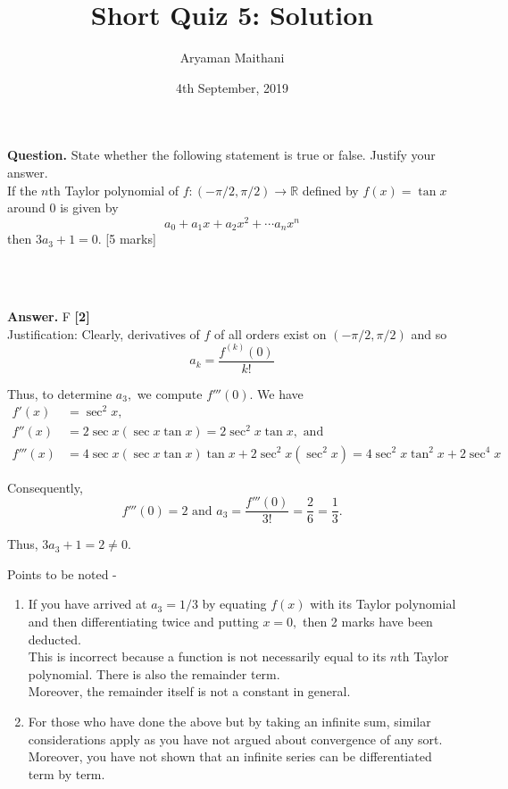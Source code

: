 \documentclass{article}
\title{Short Quiz 5: Solution}      %
\author{Aryaman Maithani}
\date{4th September, 2019}  		 %
\begin{document}
\maketitle

\hrulefill

\textbf{Question.} State whether the following statement is true or false. Justify your answer.\\ 
If the $n$th Taylor polynomial of $f:\left(-\pi/2, \pi/2\right) \to \mathbb{R}$ defined by $f(x) = \tan x$ around $0$ is given by
\[a_0 + a_1x + a_2x^2 + \cdots a_nx^n\]
then $3a_3 + 1 = 0.$
\hfill [5 marks]
\begin{flushright}
	\\~\\
\end{flushright}

\hrulefill

\textbf{Answer.} F \hfill \textbf{[2]}\\  %
Justification: Clearly, derivatives of $f$ of all orders exist on $(-\pi/2, \pi/2)$ and so
\[a_k = \frac{f^{(k)}(0)}{k!}\]
\begin{flushright}
	[1]
\end{flushright}
Thus, to determine $a_3,$ we compute $f'''(0).$ We have
\begin{align*}
	f'(x) &= \sec^2x,\\
	f''(x) &= 2\sec x(\sec x\tan x) = 2\sec^2 x\tan x, \text{ and }\\
	f'''(x) &= 4\sec x(\sec x\tan x)\tan x + 2\sec^2 x(\sec^2 x) = 4\sec^2x\tan^2x + 2\sec^4x
\end{align*}
\begin{flushright}
	[1]
\end{flushright}
Consequently,
\[f'''(0) = 2 \text{ and } a_3 = \frac{f'''(0)}{3!} = \frac{2}{6} = \frac{1}{3}.\]
\begin{flushright}
	[1]
\end{flushright}
Thus, $3a_3 + 1 = 2 \neq 0.$ 

\hrulefill

\vspace{0.2 cm}

Points to be noted -
\begin{enumerate} 
	\item If you have arrived at $a_3 = 1/3$ by equating $f(x)$ with its Taylor polynomial and then differentiating twice and putting $x = 0,$ then 2 marks have been deducted.\\
	This is incorrect because a function is not necessarily equal to its $n$th Taylor polynomial. There is also the remainder term.\\
	Moreover, the remainder itself is not a constant in general.
	\item For those who have done the above but by taking an infinite sum, similar considerations apply as you have not argued about convergence of any sort.\\
	Moreover, you have not shown that an infinite series can be differentiated term by term.
\end{enumerate}
\end{document}
